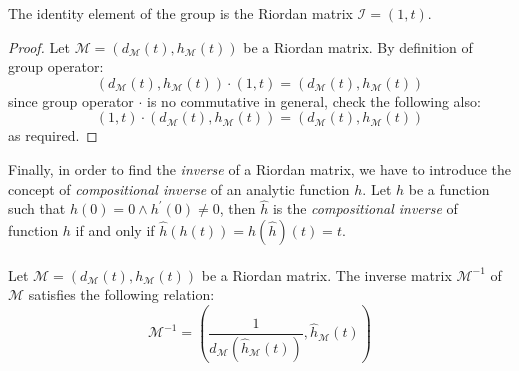 The  identity element of the group
is the Riordan matrix $\mathcal{I}=(1,t)$.
\begin{proof}
    Let $\mathcal{M}=\left(d_{\mathcal{M}}(t),h_{\mathcal{M}}(t)\right)$ be a Riordan matrix.
    By definition of group operator:
    \begin{displaymath}
        \left(d_{\mathcal{M}}(t),h_{\mathcal{M}}(t)\right)\cdot \left(1,t\right) = 
            \left(d_{\mathcal{M}}(t), h_{\mathcal{M}}(t)\right)
    \end{displaymath}
    since group operator $\cdot$ is no commutative in general, check the following also:
    \begin{displaymath}
        \left(1,t\right) \cdot \left(d_{\mathcal{M}}(t),h_{\mathcal{M}}(t)\right)= 
            \left(d_{\mathcal{M}}(t), h_{\mathcal{M}}(t)\right)
    \end{displaymath}
    as required.
\end{proof}

Finally, in order to find the \emph{inverse} of a Riordan matrix, we have to
introduce the concept of 
\emph{compositional inverse} of an analytic function $h$.
Let $h$ be a function such that $h(0)=0 \wedge h^{\prime}(0)\neq0$, then
$\hat{h}$ is the \emph{compositional inverse} of function $h$ if and only if 
$\hat{h}(h(t))=h(\hat{h})(t)=t$. 
\\\\
Let $\mathcal{M}=\left(d_{\mathcal{M}}(t),h_{\mathcal{M}}(t)\right)$ be a Riordan matrix.
The inverse matrix $\mathcal{M}^{-1}$ of $\mathcal{M}$ satisfies the following relation:
\begin{displaymath}
    \mathcal{M}^{-1}=\left(
        \frac{1}{d_{\mathcal{M}}(\hat{h}_{\mathcal{M}}(t))}, \hat{h}_{\mathcal{M}}(t)
    \right)
\end{displaymath}

